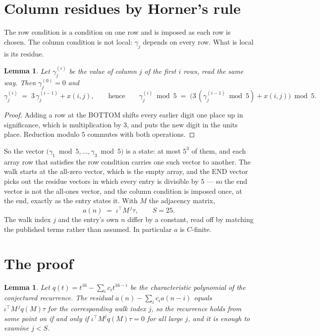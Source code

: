 \documentclass[11pt,a4paper]{article}
\theoremstyle{plain}
\newtheorem{lemma}[theorem]{Lemma}
\theoremstyle{definition}
\begin{document}
\section{Column residues by Horner's rule}

The row condition is a condition on one row and is imposed as each row is chosen. The column
condition is not local: $\gamma_j$ depends on every row. What is local is its residue.

\begin{lemma}\label{lem:horner}
Let $\gamma_j^{(i)}$ be the value of column $j$ of the first $i$ rows, read the same way.
Then $\gamma_j^{(0)}=0$ and
\[
\gamma_j^{(i)}\;=\;3\,\gamma_j^{(i-1)}+x(i,j),
\qquad\text{hence}\qquad
\gamma_j^{(i)}\bmod 5\;=\;
\bigl(3\,(\gamma_j^{(i-1)}\bmod 5)+x(i,j)\bigr)\bmod 5 .
\]
\end{lemma}

\begin{proof}
Adding a row at the BOTTOM shifts every earlier digit one place up in significance, which is
multiplication by $3$, and puts the new digit in the units place. Reduction modulo
$5$ commutes with both operations.
\end{proof}

So the vector $\bigl(\gamma_1\bmod 5,\dots,\gamma_{3}\bmod
5\bigr)$ is a state: at most $5^{3}$ of them, and each array row
that satisfies the row condition carries one such vector to another. The walk starts at the
all-zero vector, which is the empty array, and the END vector picks out the residue vectors in
which every entry is divisible by $5$ --- so the end vector is not the all-ones
vector, and the column condition is imposed once, at the end, exactly as the entry states it.
With $M$ the adjacency matrix,
\[
a(n)\;=\;\iota^{\!\top}M^{\,j}\tau ,\qquad S=25.
\]
The walk index $j$ and the entry's own $n$ differ by a constant, read off by matching the
published terms rather than assumed. In particular $a$ is $C$-finite.

\section{The proof}

\begin{lemma}\label{lem:crit}
Let $q(t)=t^{16}-\sum_i c_it^{16-i}$ be the characteristic polynomial of the
conjectured recurrence. The residual $a(n)-\sum_ic_ia(n-i)$ equals
$\iota^{\!\top}M^{\,j}q(M)\tau$ for the corresponding walk index $j$, so the recurrence
holds from some point on if and only if $\iota^{\!\top}M^{j}q(M)\tau=0$ for all large $j$,
and it is enough to examine $j<S$.
\end{lemma}
\end{document}
